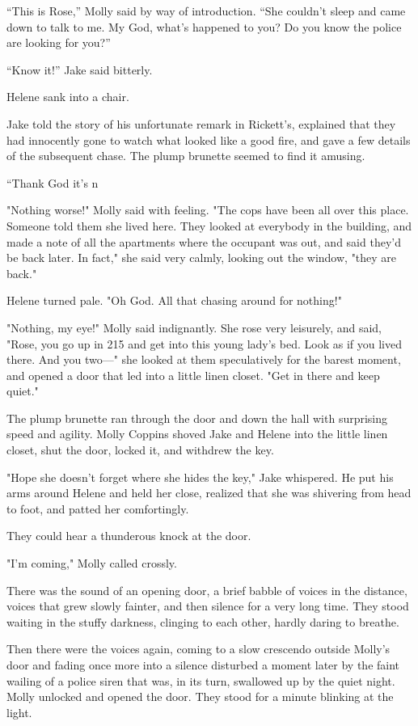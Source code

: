 \documentclass{novel}
\begin{document}
“This is Rose,” Molly said by way of introduction. “She couldn’t sleep and came down to talk to me. My God, what’s happened to you? Do you know the police are looking for you?”

“Know it!” Jake said bitterly.

Helene sank into a chair.

Jake told the story of his unfortunate remark in Rickett’s, explained that they had innocently gone to watch what looked like a good fire, and gave a few details of the subsequent chase. The plump brunette seemed to find it amusing.

“Thank God it’s n

"Nothing worse!" Molly said with feeling. "The cops have been all over this place. Someone told them she lived here. They looked at everybody in the building, and made a note of all the apartments where the occupant was out, and said they’d be back later. In fact," she said very calmly, looking out the window, "they are back."

Helene turned pale. "Oh God. All that chasing around for nothing!"

"Nothing, my eye!" Molly said indignantly. She rose very leisurely, and said, "Rose, you go up in 215 and get into this young lady’s bed. Look as if you lived there. And you two—" she looked at them speculatively for the barest moment, and opened a door that led into a little linen closet. "Get in there and keep quiet."

The plump brunette ran through the door and down the hall with surprising speed and agility. Molly Coppins shoved Jake and Helene into the little linen closet, shut the door, locked it, and withdrew the key.

"Hope she doesn’t forget where she hides the key," Jake whispered. He put his arms around Helene and held her close, realized that she was shivering from head to foot, and patted her comfortingly.

They could hear a thunderous knock at the door.

"I’m coming," Molly called crossly.

There was the sound of an opening door, a brief babble of voices in the distance, voices that grew slowly fainter, and then silence for a very long time. They stood waiting in the stuffy darkness, clinging to each other, hardly daring to breathe.

Then there were the voices again, coming to a slow crescendo outside Molly’s door and fading once more into a silence disturbed a moment later by the faint wailing of a police siren that was, in its turn, swallowed up by the quiet night. Molly unlocked and opened the door. They stood for a minute blinking at the light.
\end{document}
